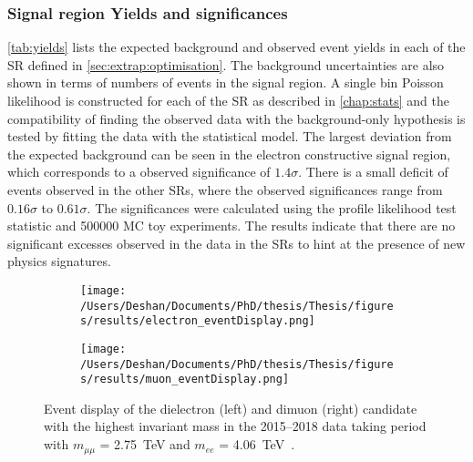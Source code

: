 \subsubsection{Signal region Yields and significances}

\cref{tab:yields} lists the expected background and observed event yields in each of the SR defined in \cref{sec:extrap:optimisation}. The background uncertainties are also shown in terms of numbers of events in the signal region. A single bin Poisson likelihood is constructed for each of the SR as described in \cref{chap:stats} and the compatibility of finding the observed data with the background-only hypothesis is tested by fitting the data with the statistical model. The largest deviation from the expected background can be seen in the electron constructive signal region, which corresponds to a observed significance of $1.4\sigma$. There is a small deficit of events observed in the other SRs, where the observed significances range from $0.16\sigma$ to $0.61\sigma$. The significances were calculated using the profile likelihood test statistic and 500000 MC toy experiments. The results indicate that there are no significant excesses observed in the data in the SRs to hint at the presence of new physics signatures. 

\begin{figure}[!htpb]
    \centering
    \begin{subfigure}[b]{0.49\textwidth}
        \centering
        \texttt{[image: /Users/Deshan/Documents/PhD/thesis/Thesis/figures/results/electron\_eventDisplay.png]}
        \label{fig:eventDisplay1}
    \end{subfigure}
    \begin{subfigure}[b]{0.49\textwidth}
        \centering
        \texttt{[image: /Users/Deshan/Documents/PhD/thesis/Thesis/figures/results/muon\_eventDisplay.png]}
        \label{fig:eventDisplay2}
    \end{subfigure}
    \caption[Event display of the dielectron and dimuon candidate with the highest invariant mass in the 2015--2018 data taking period]{
    Event display of the dielectron (left) and dimuon (right) candidate with the highest invariant mass in the 2015--2018 data taking period with $m_{\mu\mu}$ = \SI{2.75}{\tera\electronvolt} and $m_{ee}$ = \SI{4.06}{\tera\electronvolt}~\cite{Aad:2019fac}.
    }
    \label{fig:eventDisplay}
\end{figure}

